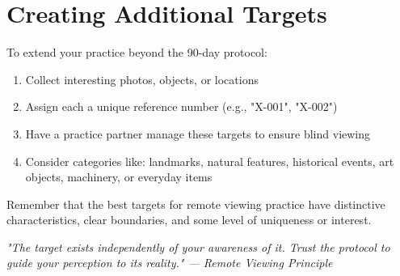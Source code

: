 \documentclass[10pt,twoside,final]{book} %
\newenvironment{quotebox}
  {\begin{mdframed}[
    topline=true, bottomline=true, leftline=false, rightline=false,
    linewidth=0.5pt, linecolor=rvaccent, %
    backgroundcolor=quotecolor, %
    shadow=true, shadowsize=1pt, shadowcolor=graydarker!30, %
    innertopmargin=10pt, innerbottommargin=10pt
  ]
    \centering\small\itshape}
  {\end{mdframed}}
\begin{document}
\section*{Creating Additional Targets}
\begin{mdframed}[backgroundcolor=rvlight, linewidth=0.7pt, linecolor=rvprimary, shadow=true, shadowsize=1pt, shadowcolor=graydark!40, roundcorner=3pt]
To extend your practice beyond the 90-day protocol:

\begin{enumerate}
\item Collect interesting photos, objects, or locations
\item Assign each a unique reference number (e.g., "X-001", "X-002")
\item Have a practice partner manage these targets to ensure blind viewing
\item Consider categories like: landmarks, natural features, historical events, art objects, machinery, or everyday items
\end{enumerate}

Remember that the best targets for remote viewing practice have distinctive characteristics, clear boundaries, and some level of uniqueness or interest.
\end{mdframed}

\begin{quotebox}
"The target exists independently of your awareness of it. Trust the protocol to guide your perception to its reality." — Remote Viewing Principle
\end{quotebox}
\end{document}
